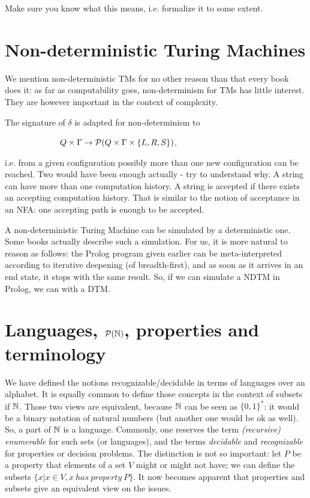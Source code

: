 Make sure you know what this means, i.e. formalize it to some extent.



\section{Non-deterministic Turing Machines}

We mention non-deterministic TMs for no other reason than that every
book does it: as far as computability goes, non-determinism for TMs
has little interest. They are however important in the context of
complexity.

The signature of $\delta$ is adapted for non-determinism to

~~~~~~~~~~~~~$Q \times \Gamma \rightarrow {\cal P}(Q \times \Gamma
\times \{L,R,S\})$,

i.e. from a given configuration possibly more than one new
configuration can be reached. Two would have been enough actually -
try to understand why. A string can have more than one computation history. A string is accepted if there exists an accepting computation history.
That is similar to the notion of acceptance in an NFA: one accepting
path is enough to be accepted.

A non-deterministic Turing Machine can be simulated by a
deterministic one. Some books actually describe such a
simulation. For us, it is more natural to reason as follows:
the Prolog program given earlier can be meta-interpreted according to
iterative deepening (of breadth-first), and as soon as it arrives in an end state, it stops with the same result. So, if we can simulate a NDTM in Prolog, we can with a DTM.


\section{Languages, ${\cal P}(\mathbb{N})$, properties and terminology}

We have defined the notions recognizable/decidable in terms of
languages over an alphabet. It is equally common to define those
concepts in the context of subsets if $\mathbb{N}$. Those two views are
equivalent, because $\mathbb{N}$ can be seen as $\{0,1\}^*$: it would be a
binary notation of natural numbers (but another one would be ok as
well). So, a part of $\mathbb{N}$ is a language. Commonly, one reserves the
term {\em (recursive) enumerable} for such sets (or languages), and
the terms {\em decidable} and {\em recognizable} for properties or
decision problems. The distinction is not so important: let $P$ be a
property that elements of a set $V$ might or might not have; we can
define the subsets $\{x | x \in V, x~has~property~P\}$. It now becomes
apparent that properties and subsets give an equivalent view on the
issues.

